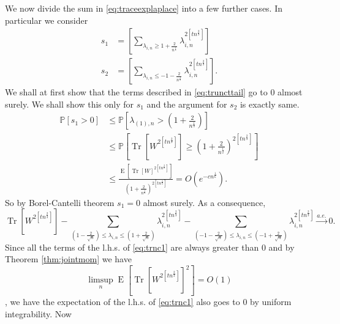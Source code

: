 \documentclass[12pt]{article}
\numberwithin{equation}{section}
\numberwithin{equation}{section}
\theoremstyle{definition}
\DeclareMathOperator{\E}{E} \DeclareMathOperator{\var}{Var}
\DeclareMathOperator{\Tr}{Tr}
\renewcommand{\1}{\bf 1}
\begin{document}
\noindent 
We now divide the sum in \eqref{eq:traceexplaplace} into a few further cases. In particular we consider 
\begin{equation}\label{eq:truncttail}
\begin{split}
s_{1}&= \left[\sum_{\lambda_{i,n} \ge 1+ \frac{2}{n^{\frac{1}{2}}}}  \lambda_{i,n}^{2[tn^{\frac{2}{3}}]} \right]\\
s_{2}&=  \left[\sum_{\lambda_{i,n} \le -1- \frac{2}{n^{\frac{1}{2}}}}  \lambda_{i,n}^{2[tn^{\frac{2}{3}}]} \right].
\end{split}
\end{equation}
We shall at first show that the terms described in \eqref{eq:truncttail} go to $0$ almost surely. We shall show this only for $s_{1}$ and the argument for $s_{2}$ is exactly same. 
\begin{equation}
\begin{split}
\mathbb{P}\left[ s_{1} >0 \right]&\le \mathbb{P}\left[ \lambda_{(1),n} > \left(1+\frac{2}{n^{\frac{1}{2}}}\right) \right]\\
& \le \mathbb{P}\left[ \Tr[W^{2[tn^{\frac{2}{3}}]}] \ge \left( 1+ \frac{2}{n^{\frac{1}{2}}} \right)^{2[tn^{\frac{2}{3}}]}\right]\\
& \le \frac{\E\left[\Tr[W]^{2[tn^{\frac{2}{3}}]}\right] }{\left( 1+ \frac{2}{n^{\frac{1}{2}}} \right)^{2[tn^{\frac{2}{3}}]}}=O\left( e^{-cn^{\frac{1}{6}}} \right).
\end{split}
\end{equation}  
So by Borel-Cantelli theorem $s_{1}= 0$ almost surely. As a consequence, 
\begin{equation}\label{eq:trnc1}
\Tr[W^{2[tn^{\frac{2}{3}}]}]- \sum_{\left(1- \frac{2}{\sqrt{n}}\right)\le \lambda_{i,n}\le \left( 1+ \frac{2}{\sqrt{n}} \right)} \lambda_{i,n}^{2[tn^{\frac{2}{3}}]} - \sum_{\left( -1 - \frac{2}{\sqrt{n}} \right)\le \lambda_{i,n}\le \left( -1 + \frac{2}{\sqrt{n}} \right)}\lambda_{i,n}^{2[tn^{\frac{2}{3}}]} \stackrel{a.e.}{\to} 0.
\end{equation}
Since all the terms of the l.h.s. of \eqref{eq:trnc1} are always greater than $0$ and by Theorem \ref{thm:jointmom} we have $$\limsup_{n}\E\left[ \Tr\left[W^{2[tn^{\frac{2}{3}}]}\right]^2 \right]=O(1)$$, we have the expectation of the l.h.s. of \eqref{eq:trnc1} also goes to $0$ by uniform integrability. Now
\end{document}
